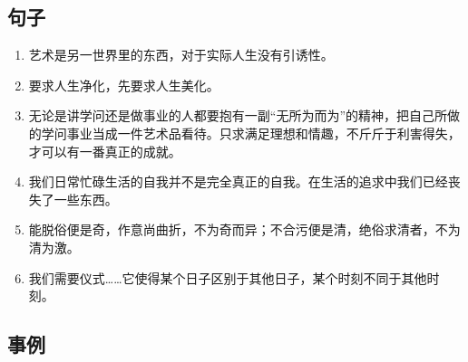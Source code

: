 \subsection{句子}
\begin{enumerate}
\item 艺术是另一世界里的东西，对于实际人生没有引诱性。
\item 要求人生净化，先要求人生美化。
\item 无论是讲学问还是做事业的人都要抱有一副“无所为而为”的精神，把自己所做的学问事业当成一件艺术品看待。只求满足理想和情趣，不斤斤于利害得失，才可以有一番真正的成就。
\item 我们日常忙碌生活的自我并不是完全真正的自我。在生活的追求中我们已经丧失了一些东西。
\item 能脱俗便是奇，作意尚曲折，不为奇而异；不合污便是清，绝俗求清者，不为清为激。
\item 我们需要仪式……它使得某个日子区别于其他日子，某个时刻不同于其他时刻。
\end{enumerate}
\subsection{事例}
